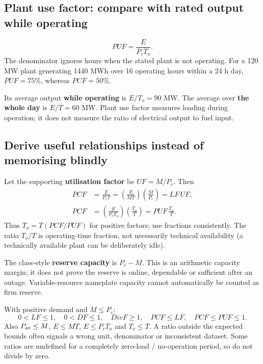 \documentclass[11pt,a4paper]{article}
\newenvironment{Idea}[1]{\begin{tcolorbox}[colback=pale,colframe=teal,coltitle=white,title={#1}]}{\end{tcolorbox}}
\begin{document}
\subsection{Plant use factor: compare with rated output while operating}
\[
\boxed{PUF=\frac{E}{P_c T_o}}.
\]
The denominator ignores hours when the stated plant is not operating. For a 120 MW plant generating 1440 MWh over 16 operating hours within a 24 h day, $PUF=75\%$, whereas $PCF=50\%$.

Its average output \textbf{while operating} is $E / T_o=90$ MW. The average over \textbf{the whole day} is $E / T=60$ MW. Plant use factor measures loading during operation; it does not measure the ratio of electrical output to fuel input.

\subsection{Derive useful relationships instead of memorising blindly}
Let the supporting \textbf{utilisation factor} be $UF=M / P_c$. Then
\begin{align*}
PCF&=\frac{E}{P_c T}
=\left(\frac{E}{M T}\right)\left(\frac{M}{P_c}\right)
=LF\,UF,\\
PCF&=\left(\frac{E}{P_c T_o}\right)\left(\frac{T_o}{T}\right)
=PUF\,\frac{T_o}{T}.
\end{align*}
Thus $T_o=T(PCF / PUF)$ for positive factors; use fractions consistently. The ratio $T_o / T$ is operating-time fraction, not necessarily technical availability (a technically available plant can be deliberately idle).

The class-style \textbf{reserve capacity} is $P_c-M$. This is an arithmetic capacity margin; it does not prove the reserve is online, dependable or sufficient after an outage. Variable-resource nameplate capacity cannot automatically be counted as firm reserve.

\begin{Idea}{Consistency checks for ordinary class problems}
With positive demand and $M\le P_c$:
\[
0<LF\le1,\quad 0<DF\le1,\quad DivF\ge1,
\quad PCF\le LF,\quad PCF\le PUF\le1.
\]
Also $P_{\rm av}\le M$, $E\le MT$, $E\le P_cT_o$ and $T_o\le T$. A ratio outside the expected bounds often signals a wrong unit, denominator or inconsistent dataset. Some ratios are undefined for a completely zero-load / no-operation period, so do not divide by zero.
\end{Idea}
\end{document}
